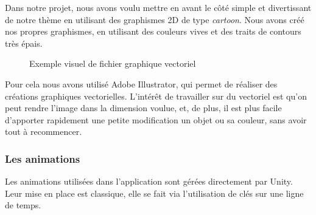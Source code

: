 Dans notre projet, nous avons voulu mettre en avant le côté simple et divertissant de notre thème en utilisant des graphismes 2D de type \textit{cartoon}. Nous avons créé nos propres graphismes, en utilisant des couleurs vives et des traits de contours très épais.

\begin{figure}[H]\centering
  \caption{Exemple visuel de fichier graphique vectoriel}
  \label{SelectionMiniJeu}
\end{figure}

Pour cela nous avons utilisé Adobe Illustrator, qui permet de réaliser des créations graphiques vectorielles. L'intérêt de travailler sur du vectoriel est qu'on peut rendre l'image dans la dimension voulue, et, de plus, il est plus facile d'apporter rapidement une petite modification un objet ou sa couleur, sans avoir tout à recommencer.

\subsubsection{Les animations}
\label{anims}
Les animations utilisées dans l'application sont gérées directement par Unity. Leur mise en place est classique, elle se fait via l'utilisation de clés sur une ligne de temps. 

